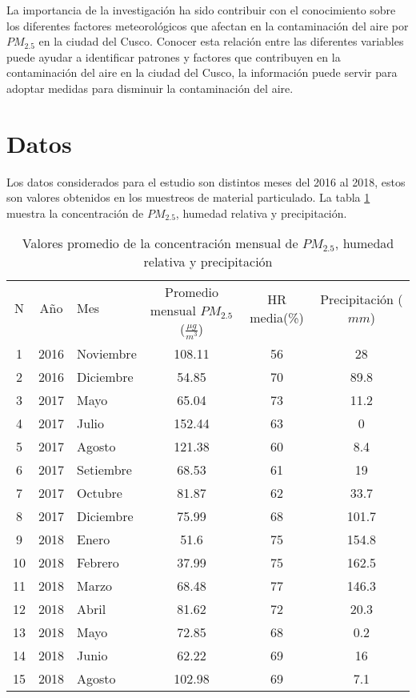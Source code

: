 \documentclass[a4paper,11pt]{article}
\begin{document}
La importancia de la investigación ha sido contribuir con el conocimiento sobre los diferentes factores meteorológicos que afectan en la contaminación del aire por $PM_{2.5}$ en la ciudad del Cusco. Conocer esta relación entre las diferentes variables puede ayudar a identificar patrones y factores que contribuyen en la contaminación del aire en la ciudad del Cusco, la información puede servir para adoptar medidas para disminuir la contaminación del aire.


\section{Datos}
Los datos considerados para el estudio son distintos meses del 2016 al 2018, estos son valores obtenidos en los muestreos de material particulado. La tabla \ref{table:promedio de pm2.5} muestra la concentración de $PM_{2.5}$, humedad relativa y precipitación.
\begin{table}[H]
	\centering
 \resizebox{.8\textwidth}{!} {
		\begin{tabular}{c c l c c c}
			\toprule
                N & Año & Mes & \multirow{2}{3.5cm}{\centering Promedio mensual $PM_{2.5}$ ($\frac{\mu g}{m^3}$)} & HR media(\%) & Precipitación ($mm$) \\
	       &&&&&\\		
   \midrule
			1 & 2016 & Noviembre & 108.11 & 56 &  28 \\
			2 & 2016 & Diciembre & 54.85 & 70 &  89.8 \\
			3 & 2017 & Mayo & 65.04 & 73 &  11.2 \\
			4 & 2017 & Julio & 152.44 & 63 & 0 \\
			5 & 2017 & Agosto & 121.38 & 60 &  8.4 \\
			6 & 2017 & Setiembre & 68.53 & 61 & 19 \\
			7 & 2017 & Octubre & 81.87 & 62 &  33.7 \\
            8 & 2017 & Diciembre & 75.99 & 68 &  101.7 \\
			9 & 2018 & Enero & 51.6 & 75 &  154.8 \\
			10 & 2018 & Febrero & 37.99 & 75 &  162.5 \\
			11 & 2018 & Marzo & 68.48 & 77 & 146.3 \\
			12 & 2018 & Abril & 81.62 & 72 &  20.3 \\
			13 & 2018 & Mayo & 72.85 & 68 & 0.2 \\
			14 & 2018 & Junio & 62.22 & 69 &  16 \\
                15 & 2018 & Agosto & 102.98 & 69 &  7.1 \\
			\bottomrule
	   \end{tabular}
    }
	\caption{Valores promedio de la concentración mensual de $PM_{2.5}$, humedad relativa y precipitación}
	\label{table:promedio de pm2.5}
\end{table}
\vspace{0.15cm}
\end{document}
